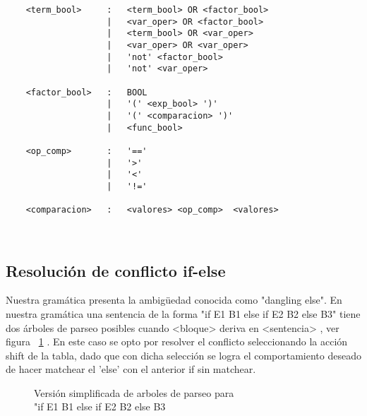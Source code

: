 \begin{verbatim}
    <term_bool>     :   <term_bool> OR <factor_bool>
                    |   <var_oper> OR <factor_bool>
                    |   <term_bool> OR <var_oper>
                    |   <var_oper> OR <var_oper>
                    |   'not' <factor_bool>
                    |   'not' <var_oper>

    <factor_bool>   :   BOOL
                    |   '(' <exp_bool> ')'
                    |   '(' <comparacion> ')'
                    |   <func_bool>

    <op_comp>       :   '=='
                    |   '>'
                    |   '<'
                    |   '!='

    <comparacion>   :   <valores> <op_comp>  <valores>

    
\end{verbatim}
\subsection{Resolución de conflicto if-else}\label{sec:pgram}
Nuestra gramática presenta la ambigüedad conocida como "dangling else". En nuestra gramática una sentencia de la forma "if E1 B1 else if E2 B2 else B3" tiene dos árboles de parseo posibles cuando <bloque> deriva en <sentencia> , ver figura ~\ref{fig:trees} .  En este caso se opto por resolver el conflicto seleccionando la acción shift de la tabla, dado que con dicha selección se logra el comportamiento deseado de hacer matchear el 'else' con el anterior if sin matchear.  

\begin{figure}[H]

    \begin{subfigure}[b]{0.3\textwidth}
    \end{subfigure}
    
    \begin{subfigure}[b]{0.3\textwidth}
    \end{subfigure}
    



     \caption{Versión simplificada de arboles de parseo para \\"if E1 B1 else if E2 B2 else B3 }
      \label{fig:trees}
\end{figure}    
